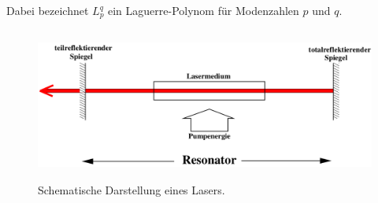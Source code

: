 Dabei bezeichnet $L_p ^q$ ein Laguerre-Polynom für Modenzahlen $p$ und $q$. 
\begin{figure}
  \centering
  \includegraphics[height = 5cm]{pics/Resonator.png}
  \caption{Schematische Darstellung eines Lasers.}
  \label{fig:sl}
\end{figure}

